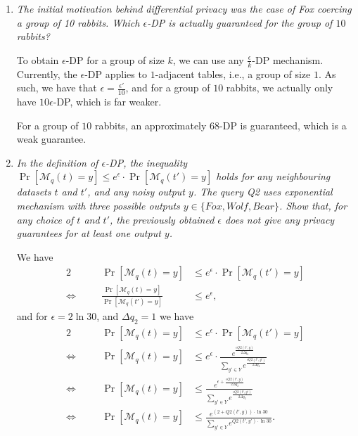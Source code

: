 \documentclass[parskip=half]{scrartcl}
\begin{document}
\begin{enumerate}
    \item \textit{The initial motivation behind differential privacy was the
    case of Fox coercing a group of 10 rabbits. Which $\epsilon$-DP is actually
    guaranteed for the group of $10$ rabbits?}

    To obtain $\epsilon$-DP for a group of size $k$, we can use any
    $\frac{\epsilon}{k}$-DP mechanism. Currently, the $\epsilon$-DP applies to
    $1$-adjacent tables, i.e., a group of size $1$. As such, we have that
    $\epsilon = \frac{\epsilon'}{10}$, and for a group of $10$ rabbits, we
    actually only have $10\epsilon$-DP, which is far weaker.

    For a group of $10$ rabbits, an approximately $68$-DP is guaranteed, which
    is a weak guarantee.

    \item \textit{In the definition of $\epsilon$-DP, the inequality
    $\Pr[\mathcal{M}_q(t) = y] \le e^\epsilon \cdot \Pr[\mathcal{M}_q(t') = y]$
    holds for any neighbouring datasets $t$ and $t'$, and any noisy output $y$.
    The query Q2 uses exponential mechanism with three possible outputs $y \in
    \{Fox, Wolf, Bear\}$. Show that, for any choice of $t$ and $t'$, the
    previously obtained $\epsilon$ does not give any privacy guarantees for at
    least one output $y$.}

    We have
    \begin{alignat*}{2}
        \quad&&
        \Pr[\mathcal{M}_q(t) = y] &\le
        e^\epsilon \cdot \Pr[\mathcal{M}_q(t') = y]\\
        \Leftrightarrow\quad&&
        \frac{\Pr[\mathcal{M}_q(t) = y]}
        {\Pr[\mathcal{M}_q(t') = y]} &\le e^\epsilon,
    \end{alignat*}
    and for $\epsilon = 2\ln{30}$, and $\Delta q_2=1$ we have
    \begin{alignat*}{2}
        \quad&&
        \Pr[\mathcal{M}_q(t) = y] &\le
        e^\epsilon \cdot \Pr[\mathcal{M}_q(t') = y]\\
        \Leftrightarrow\quad&&
        \Pr[\mathcal{M}_q(t) = y] &\le
        e^\epsilon \cdot
        \frac{
            e^{\frac{\epsilon Q2(t', y)}{2\Delta q_2}}
        }{
            \sum_{y'\in Y} e^{\frac{\epsilon Q2(t', y')}{2\Delta q_2}}
        }\\
        \Leftrightarrow\quad&&
        \Pr[\mathcal{M}_q(t) = y] &\le
        \frac{
            e^{\epsilon + \frac{\epsilon Q2(t', y)}{2\Delta q_2}}
        }{
            \sum_{y'\in Y} e^{\frac{\epsilon Q2(t', y')}{2\Delta q_2}}
        }\\
        \Leftrightarrow\quad&&
        \Pr[\mathcal{M}_q(t) = y] &\le
        \frac{
            e^{(2 + Q2(t', y)) \cdot \ln{30}}
        }{
            \sum_{y'\in Y} e^{Q2(t', y') \cdot \ln{30}}
        }.
    \end{alignat*}
    

\end{enumerate}
\end{document}
